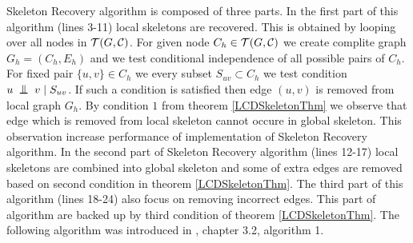 %
%


Skeleton Recovery algorithm is composed of three parts. In the first part of this algorithm (lines 3-11) local skeletons are recovered.
This is obtained by looping over all nodes in $ \mathcal{T}(G, \mathcal{C})$. For given node $C_h \in \mathcal{T}(G, \mathcal{C})$ we create
complite graph $G_h = (C_h, E_h)$ and we test conditional independence of all possible pairs of $C_h$. For fixed pair
$\{u, v\} \in C_h$ we every subset $S_{uv} \subset C_h$ we test condition $u \bigCI v \mid S_{uv}$. If such a condition
is satisfied then edge $(u, v)$ is removed from local graph $G_h$. By condition $1$ from theorem \ref{LCDSkeletonThm} we observe
that edge which is removed from local skeleton cannot occure in global skeleton. This observation increase performance
of implementation of Skeleton Recovery algorithm. In the second part of Skeleton Recovery algorithm (lines 12-17) local
skeletons are combined into global skeleton and some of extra edges are removed based on second condition in theorem \ref{LCDSkeletonThm}.
The third part of this algorithm (lines 18-24) also focus on removing incorrect edges. This part of algorithm are backed up by
third condition of theorem \ref{LCDSkeletonThm}. The following algorithm was introduced in \cite{CG}, chapter 3.2, algorithm 1.

